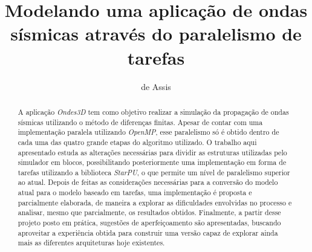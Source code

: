 \documentclass[cic,tc]{iiufrgs}
\title{Modelando uma aplicação de ondas sísmicas através do paralelismo de tarefas}
\author{de Assis}{Lucas Barros}
\begin{document}
\maketitle





\begin{abstract}
  A aplicação \textit{Ondes3D} tem como objetivo realizar a simulação da propagação de ondas sísmicas utilizando o método de diferenças finitas.
  Apesar de contar com uma implementação paralela utilizando \textit{OpenMP}, esse paralelismo só é obtido dentro de cada uma das quatro grande etapas do algoritmo utilizado.
  O trabalho aqui apresentado estuda as alterações necessárias para dividir as estruturas utilizadas pelo simulador em blocos, possibilitando
  posteriormente uma implementação em forma de tarefas utilizando a biblioteca \textit{StarPU}, o que permite um nível de paralelismo superior ao atual.
  Depois de feitas as considerações necessárias para a conversão do modelo atual para o modelo baseado em tarefas, uma implementação é proposta e parcialmente
  elaborada, de maneira a explorar as dificuldades envolvidas no processo e analisar, mesmo que parcialmente, os resultados obtidos.
  Finalmente, a partir desse projeto posto em prática, sugestões de aperfeiçoamento são apresentadas, buscando aproveitar a experiência obtida para
  construir uma versão capaz de explorar ainda mais as diferentes arquiteturas hoje existentes.
\end{abstract}
\end{document}
